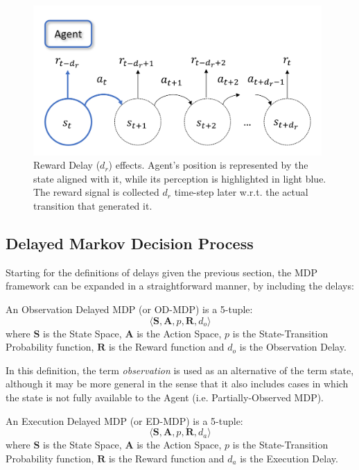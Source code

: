 \begin{figure}
                \includegraphics[width=11cm, keepaspectratio]{images/dmdp/r_delay.png}
                \caption{Reward Delay ($d_r$) effects. Agent's position is represented by the state aligned with it, while its perception is highlighted in light blue. The reward signal is collected $d_r$ time-step later w.r.t. the actual transition that generated it.}
                \label{fig:r_delay}
                
            \end{figure}
            
        \subsection{Delayed Markov Decision Process}
            Starting for the definitions of delays given the previous section, the MDP framework can be expanded in a straightforward manner, by including the delays:
            
            \begin{definition}
                \label{def:odmdp}
                An Observation Delayed MDP (or OD-MDP) is a 5-tuple:
                \[ \langle \mathbf{S}, \mathbf{A}, p, \mathbf{R}, d_o \rangle\]
                where $\mathbf{S}$ is the State Space, $\mathbf{A}$ is the Action Space, $p$ is the State-Transition Probability function, $\mathbf{R}$ is the Reward function and $d_o$ is the Observation Delay.
            \end{definition}
            
            In this definition, the term \textit{observation} is used as an alternative of the term state, although it may be more general in the sense that it also includes cases in which the state is not fully available to the Agent (i.e. Partially-Observed MDP).
            
            \begin{definition}
                \label{def:edmdp}
                An Execution Delayed MDP (or ED-MDP) is a 5-tuple:
                \[ \langle \mathbf{S}, \mathbf{A}, p, \mathbf{R}, d_a \rangle\]
                where $\mathbf{S}$ is the State Space, $\mathbf{A}$ is the Action Space, $p$ is the State-Transition Probability function, $\mathbf{R}$ is the Reward function and $d_a$ is the Execution Delay.
            \end{definition}
            
